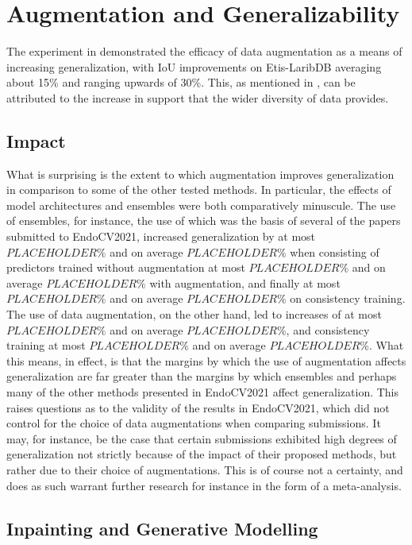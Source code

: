 \section{Augmentation and Generalizability}
The experiment in  demonstrated the efficacy of data augmentation as a means of increasing generalization, with IoU improvements on Etis-LaribDB averaging about 15\% and ranging upwards of 30\%. This, as mentioned in , can be attributed to the increase in support that the wider diversity of data provides. 

\subsection{Impact}

What is surprising is the extent to which augmentation improves generalization in comparison to some of the other tested methods. In particular, the effects of model architectures and ensembles were both comparatively minuscule. The use of ensembles, for instance, the use of which was the basis of several of the papers submitted to EndoCV2021, increased generalization by at most \(PLACEHOLDER\%\) and on average \(PLACEHOLDER\%\) when consisting of predictors trained without augmentation at most \(PLACEHOLDER\%\) and on average \(PLACEHOLDER\%\) with augmentation, and finally at most \(PLACEHOLDER\%\) and on average \(PLACEHOLDER\%\) on consistency training. The use of data augmentation, on the other hand, led to increases of at most \(PLACEHOLDER\%\) and on average \(PLACEHOLDER\%\), and consistency training at most \(PLACEHOLDER\%\) and on average \(PLACEHOLDER\%\). What this means, in effect, is that the margins by which the use of augmentation affects generalization are far greater than the margins by which ensembles and perhaps many of the other methods presented in EndoCV2021 affect generalization. This raises questions as to the validity of the results in EndoCV2021, which did not control for the choice of data augmentations when comparing submissions. It may, for instance, be the case that certain submissions exhibited high degrees of generalization not strictly because of the impact of their proposed methods, but rather due to their choice of augmentations. This is of course not a certainty, and does as such warrant further research for instance in the form of a meta-analysis. 

\subsection{Inpainting and Generative Modelling}

